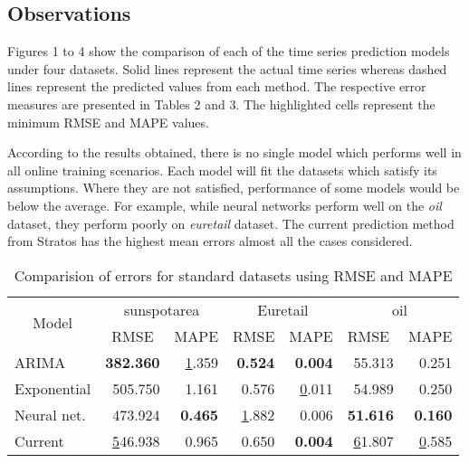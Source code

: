 \subsection{Observations}

Figures 1 to 4 show the comparison of each of the time series prediction models under four datasets. Solid lines represent the actual time series whereas dashed lines represent the predicted values from each method. The respective error measures are presented in Tables 2 and 3. The highlighted cells represent the minimum RMSE and MAPE values. 

According to the results obtained, there is no single model which performs well in all online training scenarios. Each model will fit the datasets which satisfy its assumptions. Where they are not satisfied, performance of some models would be below the average. For example, while neural networks perform well on the \textit{oil} dataset, they perform poorly on \textit{euretail} dataset. The current prediction method from Stratos has the highest mean errors almost all the cases considered.

\begin{table}[]
\centering
\caption{ Comparision of errors for standard datasets using RMSE and MAPE}
\label{my-label}
\begin{tabular}{|l|r|r|r|r|r|r|}
\hline
\multicolumn{1}{|c|}{\multirow{2}{*}{Model}} & \multicolumn{2}{c|}{sunspotarea}                      & \multicolumn{2}{c|}{Euretail}                         & \multicolumn{2}{c|}{oil}                              \\ \cline{2-7} 
\multicolumn{1}{|c|}{}                       & \multicolumn{1}{c|}{RMSE} & \multicolumn{1}{c|}{MAPE} & \multicolumn{1}{c|}{RMSE} & \multicolumn{1}{c|}{MAPE} & \multicolumn{1}{l|}{RMSE} & \multicolumn{1}{l|}{MAPE} \\ \hline
ARIMA                                        & \textbf{382.360}          & {\ul 1.359}               & \textbf{0.524}            & \textbf{0.004}            & 55.313                    & 0.251                     \\ \hline
Exponential                                  & 505.750                   & 1.161                     & 0.576                     & {\ul 0.011}               & 54.989                    & 0.250                     \\ \hline
Neural net.                                  & 473.924                   & \textbf{0.465}            & {\ul 1.882}               & 0.006                     & \textbf{51.616}           & \textbf{0.160}            \\ \hline
Current                                      & {\ul 546.938}             & 0.965                     & 0.650                     & \textbf{0.004}                     & {\ul 61.807}              & {\ul 0.585}               \\ \hline
\end{tabular}
\end{table}

